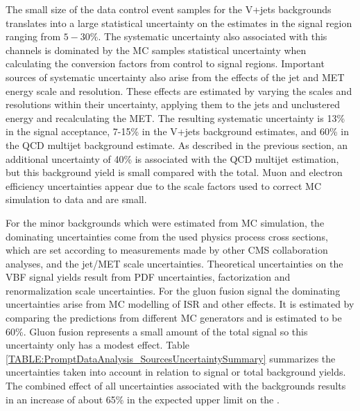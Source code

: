 The small size of the data control event samples for the V+jets backgrounds translates into a large statistical uncertainty on the estimates in the signal region ranging from $5-30\%$. The systematic uncertainty also associated with this channels is dominated by the \gls{MC} samples statistical uncertainty when calculating the conversion factors from control to signal regions. Important sources of systematic uncertainty also arise from the effects of the jet and \gls{MET} energy scale and resolution. These effects are estimated by varying the scales and resolutions within their uncertainty, applying them to the jets and unclustered energy and recalculating the \gls{MET}. The resulting systematic uncertainty is 13\% in the signal acceptance, 7-15\% in the V+jets background estimates, and 60\% in the \gls{QCD} multijet background estimate. As described in the previous section, an additional uncertainty of 40\% is associated with the \gls{QCD} multijet estimation, but this background yield is small compared with the total. Muon and electron efficiency uncertainties appear due to the scale factors used to correct \gls{MC} simulation to data and are small. 

For the minor backgrounds which were estimated from \gls{MC} simulation, the dominating uncertainties come from the used physics process cross sections, which are set according to measurements made by other \gls{CMS} collaboration analyses, and the jet/\gls{MET} scale uncertainties. Theoretical uncertainties on the \gls{VBF} signal yields result from \gls{PDF} uncertainties, factorization and renormalization scale uncertainties. For the gluon fusion signal the dominating uncertainties arise from \gls{MC} modelling of \gls{ISR} and other effects. It is estimated by comparing the predictions from different \gls{MC} generators and is estimated to be 60\%. Gluon fusion represents a small amount of the total signal so this uncertainty only has a modest effect. Table \ref{TABLE:PromptDataAnalysis_SourcesUncertaintySummary} summarizes the uncertainties taken into account in relation to signal or total background yields. The combined effect of all uncertainties associated with the backgrounds results in an increase of about 65\% in the expected upper limit on the \BRinv.

